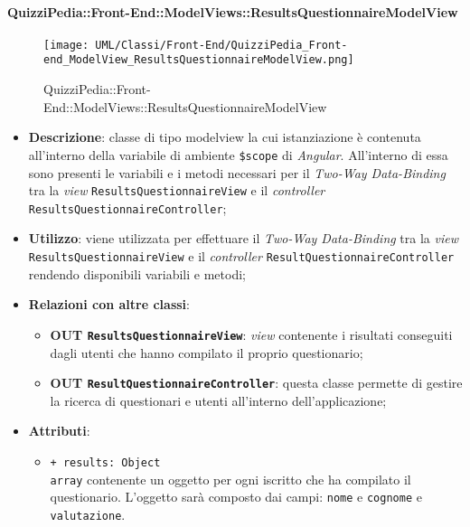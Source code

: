 \paragraph{QuizziPedia::Front-End::ModelViews::ResultsQuestionnaireModelView}
	
	\label{QuizziPedia::Front-End::ModelViews::ResultsQuestionnaireModelView}
	
	\begin{figure}[ht]
		\centering
		\texttt{[image: UML/Classi/Front-End/QuizziPedia\_Front-end\_ModelView\_ResultsQuestionnaireModelView.png]}
		\caption{QuizziPedia::Front-End::ModelViews::ResultsQuestionnaireModelView}
	\end{figure} \FloatBarrier
	
	\begin{itemize}
		\item \textbf{Descrizione}: classe di tipo modelview la cui istanziazione è contenuta all'interno della variabile di ambiente \texttt{\$scope} di \textit{Angular}. All'interno di essa sono presenti le variabili e i metodi necessari per il \textit{Two-Way Data-Binding} tra la \textit{view} \texttt{ResultsQuestionnaireView} e il \textit{controller} \texttt{ResultsQuestionnaireController};
		\item \textbf{Utilizzo}: viene utilizzata per effettuare il \textit{Two-Way Data-Binding} tra la \textit{view}\\ \texttt{ResultsQuestionnaireView} e il \textit{controller} \texttt{ResultQuestionnaireController} rendendo disponibili variabili e metodi;
		\item \textbf{Relazioni con altre classi}: 
		\begin{itemize}
			\item \textbf{OUT \texttt{ResultsQuestionnaireView}}: \textit{view} contenente i risultati conseguiti dagli utenti che hanno compilato il proprio questionario; 
			\item \textbf{OUT \texttt{ResultQuestionnaireController}}: questa classe permette di gestire la ricerca di questionari e utenti all’interno dell’applicazione;
		\end{itemize}
		\item \textbf{Attributi}: 
		\begin{itemize}
				\item \texttt{+ results: Object} \\ \texttt{array} contenente un oggetto per ogni iscritto che ha compilato il questionario. L'oggetto sarà composto dai campi: \texttt{nome} e \texttt{cognome} e \texttt{valutazione}.

\end{itemize}
\end{itemize}
